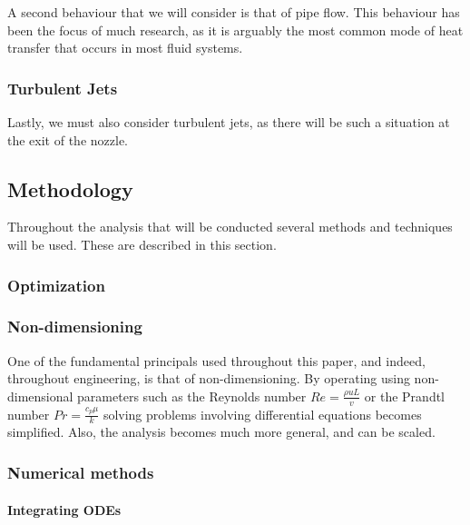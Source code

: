 A second behaviour that we will consider is that of pipe flow. This behaviour has been the focus of much research, as it is arguably the most common mode of heat transfer that occurs in most fluid systems.

\subsubsection{Turbulent Jets}

Lastly, we must also consider turbulent jets, as there will be such a situation at the exit of the nozzle. 


\subsection{Methodology}

Throughout the analysis that will be conducted several methods and techniques will be used. These are described in this section.

\subsubsection{Optimization}
\subsubsection{Non-dimensioning}

One of the fundamental principals used throughout this paper, and indeed, throughout engineering, is that of non-dimensioning. By operating using non-dimensional parameters such as the Reynolds number $Re = \frac{\rho u L}{v}$ or the Prandtl number $Pr = \frac{c_p \mu}{k}$ solving problems involving differential equations becomes simplified. Also, the analysis becomes much more general, and can be scaled.

\subsubsection{Numerical methods}
\label{sec:numerical_methods}
\paragraph{Integrating ODEs}

